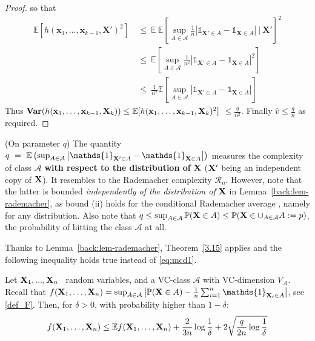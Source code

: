 \begin{proof}
\noindent
so that 
\begin{align*}
\mathbb{E} \left [ h(\mathbf{x}_1,\ldots,\mathbf{x}_{k-1},\mathbf{X}')^2\right] &~\le~ \mathbb{E}~ \mathbb{E} \left [  \sup_{A \in \mathcal{A}} \frac{1}{n} \left | \mathds{1}_{\mathbf{X}' \in A} - \mathds{1}_{\mathbf{X} \in A}  \right| ~\Big|~ \mathbf{X}' \right]^2 \\
&~\le~ \mathbb{E} \left [  \sup_{A \in \mathcal{A}} \frac{1}{n^2} \left | \mathds{1}_{\mathbf{X}' \in A} - \mathds{1}_{\mathbf{X} \in A}  \right|^2 \right] \\
&~\le~ \frac{1}{n^2} \mathbb{E} \left [  \sup_{A \in \mathcal{A}}  \left | \mathds{1}_{\mathbf{X}' \in A} - \mathds{1}_{\mathbf{X} \in A}  \right|  \right] 
\end{align*}
\noindent
Thus $\mathbf{Var}(h(\mathbf{x}_1,\ldots,\mathbf{x}_{k-1},\mathbf{X}_k)) \le \mathbb{E} [h(\mathbf{x}_1,\ldots,\mathbf{x}_{k-1},\mathbf{X}_k)^2]$ $ \le \frac{q}{n^2}$. Finally $\hat v \le \frac{q}{n}$ as required.
\end{proof}

\begin{remark}({\sc On parameter} $q$)
The quantity $q~=~ \mathbb{E}\left ( \sup_{A \in \mathcal{A}} \left | \mathds{1}_{\mb X' \in A} - \mathds{1}_{\mb X \in A} \right|\right)$ measures the complexity of class $\mathcal{A}$ \textbf{with respect to the distribution of} $\mathbf X$ ($\mathbf X'$ being an independent copy of $\mathbf X$). It resembles to the Rademacher complexity $\mathcal{R}_n$. %
However, note that the latter is bounded \emph{independently of the distribution of} $\mathbf X$ in Lemma~\ref{back:lem-rademacher}, as bound (ii)  holds for the conditional Rademacher average%
, namely for any distribution.
%
Also note that $q \le \sup_{A \in \mathcal{A}} \mathbb{P}(\mathbf X \in A) \le \mathbb{P}(\mathbf X \in \cup_{A \in \mathcal{A}}A :=p) $, the probability of hitting the class $\mathcal{A}$ at all.
\end{remark}

Thanks to Lemma~\ref{back:lem-rademacher}, Theorem~\ref{3.15} applies and the following inequality holds true instead of \eqref{eq:mcd1}.

\begin{proposition}
\label{TVCsharp}
Let $\mathbf X_1,...,\mathbf X_n$ \iid~random variables, and a VC-class $\mathcal{A}$ with VC-dimension $V_{\mathcal{A}}$. 
Recall that $f(\mb X_1,\ldots,\mb X_n) = \sup_{A \in \mathcal{A}} \left | \mathbb{P}(\mb X \in A) - \frac{1}{n} \sum_{i=1}^n \mathds{1}_{\mb X_i \in A} \right|$, see \eqref{def_F}. Then, for $\delta>0$, with probability higher than $1-\delta$:
\begin{align}
\label{eq:mcd1improved}
f(\mathbf X_1,\ldots,\mathbf X_n) \le \mathbb{E}f(\mathbf X_1,\ldots,\mathbf X_n) + \frac{2}{3n} \log{\frac{1}{\delta}} + 2\sqrt{\frac{q}{2n} \log{\frac{1}{\delta}}}
\end{align}
\end{proposition}

